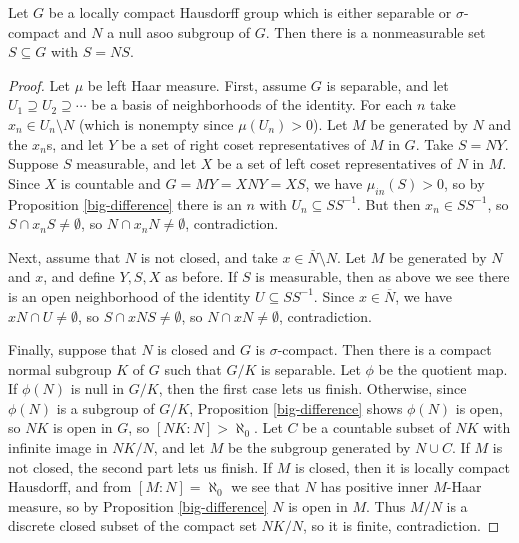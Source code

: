 \documentclass[letterpaper,11pt]{report}
\begin{document}
\begin{lem} Let $G$ be a locally compact Hausdorff group which is either separable or $\sigma$-compact and $N$ a null asoo subgroup of $G$. Then there is a nonmeasurable set $S \subseteq G$ with $S = NS$.
\end{lem}
\begin{proof} Let $\mu$ be left Haar measure. First, assume $G$ is separable, and let $U_1 \supseteq U_2 \supseteq \cdots$ be a basis of neighborhoods of the identity. For each $n$ take $x_n \in U_n \setminus N$ (which is nonempty since $\mu(U_n) > 0$). Let $M$ be generated by $N$ and the $x_n$s, and let $Y$ be a set of right coset representatives of $M$ in $G$. Take $S = NY$. Suppose $S$ measurable, and let $X$ be a set of left coset representatives of $N$ in $M$. Since $X$ is countable and $G = MY = XNY = XS$, we have $\mu_{in}(S) > 0$, so by Proposition \ref{big-difference} there is an $n$ with $U_n \subseteq SS^{-1}$. But then $x_n \in SS^{-1}$, so $S\cap x_nS \ne \emptyset$, so $N\cap x_nN \ne \emptyset$, contradiction.

Next, assume that $N$ is not closed, and take $x \in \overline{N}\setminus N$. Let $M$ be generated by $N$ and $x$, and define $Y,S,X$ as before. If $S$ is measurable, then as above we see there is an open neighborhood of the identity $U \subseteq SS^{-1}$. Since $x \in \overline{N}$, we have $xN \cap U \ne \emptyset$, so $S \cap xNS \ne \emptyset$, so $N \cap xN \ne \emptyset$, contradiction.

Finally, suppose that $N$ is closed and $G$ is $\sigma$-compact. Then there is a compact normal subgroup $K$ of $G$ such that $G/K$ is separable. Let $\phi$ be the quotient map. If $\phi(N)$ is null in $G/K$, then the first case lets us finish. Otherwise, since $\phi(N)$ is a subgroup of $G/K$, Proposition \ref{big-difference} shows $\phi(N)$ is open, so $NK$ is open in $G$, so $[NK:N] > \aleph_0$. Let $C$ be a countable subset of $NK$ with infinite image in $NK/N$, and let $M$ be the subgroup generated by $N \cup C$. If $M$ is not closed, the second part lets us finish. If $M$ is closed, then it is locally compact Hausdorff, and from $[M:N] = \aleph_0$ we see that $N$ has positive inner $M$-Haar measure, so by Proposition \ref{big-difference} $N$ is open in $M$. Thus $M/N$ is a discrete closed subset of the compact set $NK/N$, so it is finite, contradiction.
\end{proof}
\end{document}
